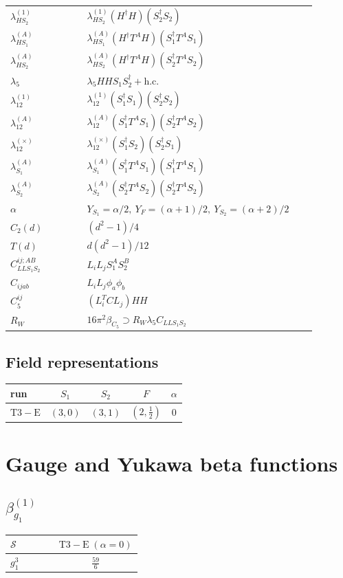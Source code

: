 \documentclass[9pt]{article}
\begin{document}
\begin{longtable}{@{}p{0.23\linewidth}p{0.69\linewidth}@{}}
$\lambda_{HS_2}^{(1)}$ & $\lambda_{HS_2}^{(1)}(H^\dagger H)(S_2^\dagger S_2)$ \\
$\lambda_{HS_1}^{(A)}$ & $\lambda_{HS_1}^{(A)}(H^\dagger T^AH)(S_1^\dagger T^AS_1)$ \\
$\lambda_{HS_2}^{(A)}$ & $\lambda_{HS_2}^{(A)}(H^\dagger T^AH)(S_2^\dagger T^AS_2)$ \\
$\lambda_5$ & $\lambda_5HHS_1S_2^\dagger+\mathrm{h.c.}$ \\
$\lambda_{12}^{(1)}$ & $\lambda_{12}^{(1)}(S_1^\dagger S_1)(S_2^\dagger S_2)$ \\
$\lambda_{12}^{(A)}$ & $\lambda_{12}^{(A)}(S_1^\dagger T^AS_1)(S_2^\dagger T^AS_2)$ \\
$\lambda_{12}^{(\times)}$ & $\lambda_{12}^{(\times)}(S_1^\dagger S_2)(S_2^\dagger S_1)$ \\
$\lambda_{S_1}^{(A)}$ & $\lambda_{S_1}^{(A)}(S_1^\dagger T^A S_1)(S_1^\dagger T^A S_1)$ \\
$\lambda_{S_2}^{(A)}$ & $\lambda_{S_2}^{(A)}(S_2^\dagger T^A S_2)(S_2^\dagger T^A S_2)$ \\
$\alpha$ & $Y_{S_1}=\alpha/2,\ Y_F=(\alpha+1)/2,\ Y_{S_2}=(\alpha+2)/2$ \\
$C_2(d)$ & $(d^2-1)/4$ \\
$T(d)$ & $d(d^2-1)/12$ \\
$C_{LLS_1S_2}^{ij;AB}$ & $L_iL_jS_1^AS_2^B$ \\
$C_{ijab}$ & $L_iL_j\phi_a\phi_b$ \\
$C_5^{ij}$ & $(L_i^TCL_j)HH$ \\
$R_W$ & $16\pi^2\beta_{C_5}\supset R_W\lambda_5C_{LLS_1S_2}$ \\
\bottomrule
\end{longtable}
\subsection*{Field representations}
\begin{longtable}{@{}lcccc@{}}
\toprule
run & $S_1$ & $S_2$ & $F$ & $\alpha$ \\
\midrule
$\mathrm{T3-E}$ & $(3,0)$ & $(3,1)$ & $(2,\frac{1}{2})$ & $0$ \\
\bottomrule
\end{longtable}
\section*{Gauge and Yukawa beta functions}
\subsection*{$ \beta_{g_1}^{(1)} $}
\begin{longtable}{@{}p{0.38\linewidth}c@{}}
\toprule
$\mathcal{S}$ & $ \mathrm{T3-E}\;(\alpha=0) $ \\
\midrule
$ g_1^3 $ & $ \frac{59}{6} $ \\
\bottomrule
\end{longtable}
\end{document}
